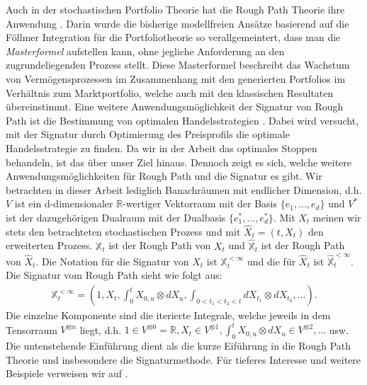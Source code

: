 \documentclass[12pt,titlepage,headsepline]{article}
\begin{document}
      \hfill\break
      Auch in der stochastischen Portfolio Theorie hat die Rough Path Theorie ihre Anwendung \cite{allan_model-free_2019}. Darin wurde die bisherige modellfreien Ansätze basierend auf die Föllmer Integration für die Portfoliotheorie so verallgemeintert, dass man die \textit{Masterformel} aufstellen kann, ohne jegliche Anforderung an den zugrundeliegenden Prozess stellt. Diese Masterformel beschreibt das Wachstum von Vermögensprozessen im Zusammenhang mit den generierten Portfolios im Verhältnis zum Marktportfolio, welche auch mit den klassischen Resultaten übereinstimmt.
      Eine weitere Anwendungsmöglichkeit der Signatur von Rough Path ist die Bestimmung von optimalen Handelsstrategien \cite{kalsi_optimal_2020}. Dabei wird versucht, mit der Signatur durch Optimierung des Preisprofils die optimale Handelsstrategie zu finden. Da wir in der Arbeit das optimales Stoppen behandeln, ist das über unser Ziel hinaus. Dennoch zeigt es sich, welche weitere Anwendungsmöglichkeiten für Rough Path und die Signatur es gibt.
      \hfill\break
      Wir betrachten in dieser Arbeit lediglich Banachräumen mit endlicher Dimension, d.h. $V$ ist ein d-dimensionaler $\mathbb{R}$-wertiger Vektorraum mit der Basis $\{e_1,\ldots,e_d\}$ und $V^*$ ist der dazugehörigen Dualraum mit der Dualbasis $\{e^*_1,\ldots,e^*_d\}$. Mit $X_t$ meinen wir stets den betrachteten stochastischen Prozess und mit $\hat{X}_t = (t,X_t)$ den erweiterten Prozess. $\mathbb{X}_t$ ist der Rough Path von $X_t$ und $\hat{\mathbb{X}}_t$ ist der Rough Path von $\hat{X}_t$. Die Notation für die Signatur von $X_t$ ist
      $\mathbb{X}^{<\infty}_t$ und die für $\hat{X}_t$ ist $\hat{\mathbb{X}}^{<\infty}_t$. Die Signatur vom Rough Path sieht wie folgt aus:
      \begin{align*}
        \mathbb{X}_t^{<\infty} = (1,X_t, \int_0^t X_{0,u} \otimes dX_u,\int_{0<t_1<t_2<t} dX_{t_1}\otimes dX_{t_2},\ldots).
      \end{align*}
      Die einzelne Komponente sind die iterierte Integrale, welche jeweils in dem Tensorraum $V^{\otimes n}$ liegt, d.h. $1 \in V^{\otimes 0} = \mathbb{R}, X_t \in V^{\otimes 1}, \int_0^t X_{0,u} \otimes dX_u \in V^{\otimes 2},\ldots$ usw.
      \hfill\break
      Die untenstehende Einführung \cite{bayer_optimal_2020,kalsi_optimal_2020} dient als die kurze Eiführung in die Rough Path Theorie und insbesondere die Signaturmethode. Für tieferes Interesse und weitere Beispiele verweisen wir auf \cite{friz_course_2014,friz_multidimensional_2009}.
\end{document}
